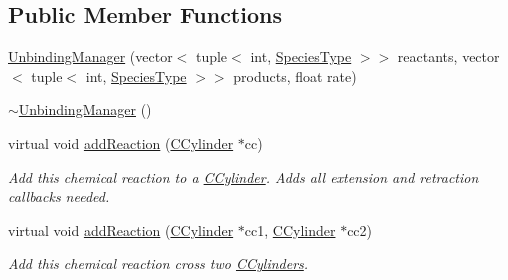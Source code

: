 \subsection*{Public Member Functions}
\begin{DoxyCompactItemize}
\item 
\hyperlink{classUnbindingManager_a701803bce8134c0dff76f3e5af78c687}{Unbinding\+Manager} (vector$<$ tuple$<$ int, \hyperlink{Species_8h_a50651af47c56ea0e27235468d23542cf}{Species\+Type} $>$$>$ reactants, vector$<$ tuple$<$ int, \hyperlink{Species_8h_a50651af47c56ea0e27235468d23542cf}{Species\+Type} $>$$>$ products, float rate)
\item 
\hyperlink{classUnbindingManager_af1a852cd326b5f62e18e9389e2ee8b8c}{$\sim$\+Unbinding\+Manager} ()
\item 
virtual void \hyperlink{classUnbindingManager_a75a0b4e709bfb0787c8cec09b7255229}{add\+Reaction} (\hyperlink{classCCylinder}{C\+Cylinder} $\ast$cc)
\begin{DoxyCompactList}\small\item\em Add this chemical reaction to a \hyperlink{classCCylinder}{C\+Cylinder}. Adds all extension and retraction callbacks needed. \end{DoxyCompactList}\item 
virtual void \hyperlink{classUnbindingManager_a94018a46f879c98bd8b82f832a07b92d}{add\+Reaction} (\hyperlink{classCCylinder}{C\+Cylinder} $\ast$cc1, \hyperlink{classCCylinder}{C\+Cylinder} $\ast$cc2)
\begin{DoxyCompactList}\small\item\em Add this chemical reaction cross two \hyperlink{classCCylinder}{C\+Cylinders}. \end{DoxyCompactList}\end{DoxyCompactItemize}
